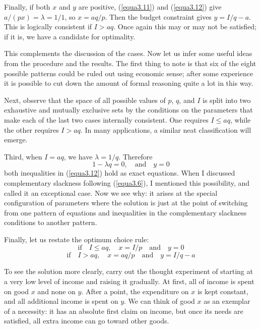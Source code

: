 Finally, if both $x$ and $y$ are positive, (\ref{equa3.11}) and (\ref{equa3.12}) give $a/(px)=\lambda=1/1$, so $x=aq/p $. Then the budget constraint gives $y=I/q-a$. This is logically consistent if $I > aq$. Once again this may or may not be satisfied; if it is, we have a candidate for optimality.

This complements the discussion of the cases. Now let us infer some useful ideas from the procedure and the results. The first thing to note is that six of the eight possible patterns could be ruled out using economic sense; after some experience it is possible to cut down the amount of formal reasoning quite a lot in this way.

Next, observe that the space of all possible values of $p$, $q$, and $I$ is split into two exhaustive and mutually exclusive sets by the conditions on the parameters that make each of the last two cases internally consistent. One requires $I \leq aq$, while the other requires $I > aq$. In many applications, a similar neat classification will emerge.

Third, when $I= aq$, we have $\lambda=1/q$. Therefore
\begin{equation*}
1 - \lambda q = 0, \quad \mbox{and} \quad y = 0
\end{equation*}
both inequalities in (\ref{equa3.12}) hold as exact equations. When I discussed complementary slackness following (\ref{equa3.6}), I mentioned this possibility, and called it an exceptional case. Now we see why: it arises at the special configuration of parameters where the solution is just at the point of switching from one pattern of equations and inequalities in the complementary slackness conditions to another pattern.

Finally, let us restate the optimum choice rule:
\begin{equation*}
\mbox{if} \quad I \leq aq, \quad x = I/p \quad \mbox{and} \quad y=0
\end{equation*}
\begin{equation*}
\mbox{if} \quad I > aq, \quad x = aq/p \quad \mbox{and} \quad y=I/q - a
\end{equation*}

To see the solution more clearly, carry out the thought experiment of starting at a very low level of income and raising it gradually. At first, all of income is spent on good $x$ and none on $y$. After a point, the expenditure on $x$ is kept constant, and all additional income is spent on $y$. We can think of good $x$ as an exemplar of a necessity: it has an absolute first claim on income, but once its needs are satisfied, all extra income can go toward other goods.

